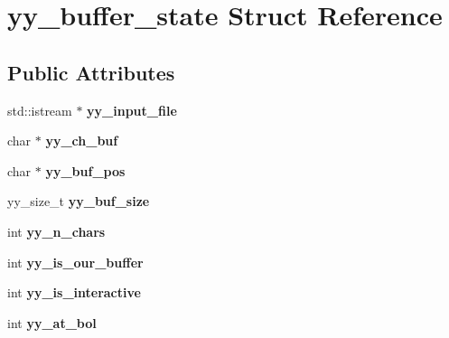 \hypertarget{structyy__buffer__state}{\section{yy\-\_\-buffer\-\_\-state Struct Reference}
\label{structyy__buffer__state}
}
\subsection*{Public Attributes}
\begin{DoxyCompactItemize}
\item 
\hypertarget{structyy__buffer__state_a3cea2f85a5c18fae4a8dd1ca44c3a977}{std\-::istream $\ast$ {\bfseries yy\-\_\-input\-\_\-file}}\label{structyy__buffer__state_a3cea2f85a5c18fae4a8dd1ca44c3a977}

\item 
\hypertarget{structyy__buffer__state_ad7b8df8d8a4688e57b0b8d3ca75adc85}{char $\ast$ {\bfseries yy\-\_\-ch\-\_\-buf}}\label{structyy__buffer__state_ad7b8df8d8a4688e57b0b8d3ca75adc85}

\item 
\hypertarget{structyy__buffer__state_a58aa927f098b99d99e75da80f9b681ef}{char $\ast$ {\bfseries yy\-\_\-buf\-\_\-pos}}\label{structyy__buffer__state_a58aa927f098b99d99e75da80f9b681ef}

\item 
\hypertarget{structyy__buffer__state_a48302f5f3477a9c78bbddf56d356ef54}{yy\-\_\-size\-\_\-t {\bfseries yy\-\_\-buf\-\_\-size}}\label{structyy__buffer__state_a48302f5f3477a9c78bbddf56d356ef54}

\item 
\hypertarget{structyy__buffer__state_a06406208824817acfec2183b79080945}{int {\bfseries yy\-\_\-n\-\_\-chars}}\label{structyy__buffer__state_a06406208824817acfec2183b79080945}

\item 
\hypertarget{structyy__buffer__state_a80ce2431c70dc4f89ced487f18449465}{int {\bfseries yy\-\_\-is\-\_\-our\-\_\-buffer}}\label{structyy__buffer__state_a80ce2431c70dc4f89ced487f18449465}

\item 
\hypertarget{structyy__buffer__state_abf5c70eea75581b58c0ee7bd31b14490}{int {\bfseries yy\-\_\-is\-\_\-interactive}}\label{structyy__buffer__state_abf5c70eea75581b58c0ee7bd31b14490}

\item 
\hypertarget{structyy__buffer__state_a9d60c60af6e1a6f69de16871fd64f85f}{int {\bfseries yy\-\_\-at\-\_\-bol}}\label{structyy__buffer__state_a9d60c60af6e1a6f69de16871fd64f85f}


\end{DoxyCompactItemize}
